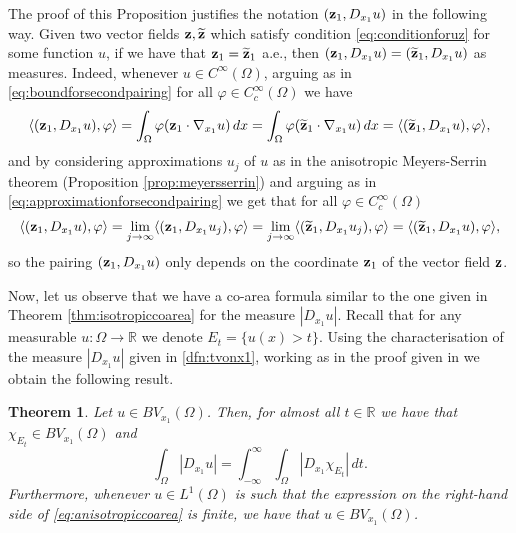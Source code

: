 \documentclass[reqno,12pt]{amsart}
\def\z{{\bf z}}
\newtheorem{theorem}{Theorem}[section]
\def\R{\mathbb R}
\numberwithin{equation}{section}
\begin{document}
The proof of this Proposition justifies the notation $(\z_1, D_{x_1} u)$ in the following way. Given two vector fields $\z, \widetilde{\z}$ which satisfy condition \eqref{eq:conditionforuz} for some function $u$, if we have that $\z_1 = \widetilde{\z}_1$ a.e., then $(\z_1, D_{x_1} u) = (\widetilde{\z}_1, D_{x_1} u)$ as measures. Indeed, whenever $u \in C^\infty(\Omega)$, arguing as in \eqref{eq:boundforsecondpairing} for all $\varphi \in C_c^\infty(\Omega)$ we have
\begin{align}
\langle (\z_1, D_{x_1} u), \varphi \rangle = \int_{\Omega} \varphi (\z_1 \cdot \nabla_{x_1} u) \, dx = \int_{\Omega} \varphi (\widetilde{\z}_1 \cdot \nabla_{x_1} u) \, dx = \langle (\widetilde{\z}_1, D_{x_1} u), \varphi \rangle,
\end{align}
and by considering approximations $u_j$ of $u$ as in the anisotropic Meyers-Serrin theorem (Proposition \ref{prop:meyersserrin}) and arguing as in \eqref{eq:approximationforsecondpairing} we get that for all $\varphi \in C_c^\infty(\Omega)$
\begin{align}
\langle (\z_1, D_{x_1} u), \varphi \rangle = \lim_{j \rightarrow \infty} \langle (\z_1, D_{x_1} u_j), \varphi \rangle = \lim_{j \rightarrow \infty} \langle (\widetilde{\z}_1, D_{x_1} u_j), \varphi \rangle = \langle (\widetilde{\z}_1, D_{x_1} u), \varphi \rangle,
\end{align}
so the pairing $(\z_1, D_{x_1} u)$ only depends on the coordinate $\z_1$ of the vector field $\z$.

Now, let us observe that we have a co-area formula similar to the one given in Theorem \ref{thm:isotropiccoarea} for the measure $|D_{x_1} u|$. Recall that for any measurable $u: \Omega \rightarrow \R$ we denote $E_t = \{ u(x) > t \}$. Using the characterisation of the measure $|D_{x_1} u|$ given in \eqref{dfn:tvonx1}, working as in the proof given in \cite[Theorem 5.5.1]{EG} we obtain the following result.

\begin{theorem}\label{thm:anisotropiccoarea}
Let $u \in BV_{x_1}(\Omega)$. Then, for almost all $t \in \R$ we have that $\chi_{E_t} \in BV_{x_1}(\Omega)$ and
\begin{equation}\label{eq:anisotropiccoarea}
\int_\Omega |D_{x_1} u| = \int_{-\infty}^\infty \int_\Omega |D_{x_1} \chi_{E_t}| \, dt.
\end{equation}
Furthermore, whenever $u \in L^1(\Omega)$ is such that the expression on the right-hand side of \eqref{eq:anisotropiccoarea} is finite, we have that $u \in BV_{x_1}(\Omega)$.
\end{theorem}
\end{document}
